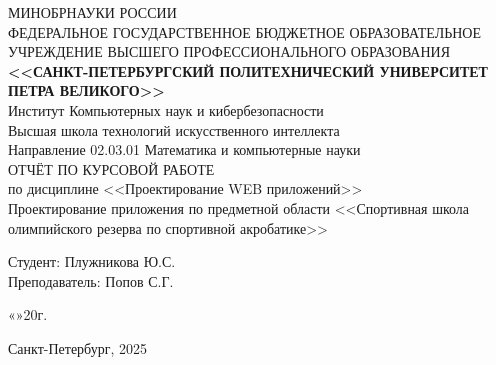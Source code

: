 \documentclass[12pt,a4paper,final]{article} %
\begin{document}
	\thispagestyle{empty}
	\begin{center}
		\vspace{36pt}
		{\Large МИНОБРНАУКИ РОССИИ }\\
		\vspace{24pt}
		{\large ФЕДЕРАЛЬНОЕ ГОСУДАРСТВЕННОЕ БЮДЖЕТНОЕ ОБРАЗОВАТЕЛЬНОЕ УЧРЕЖДЕНИЕ ВЫСШЕГО ПРОФЕССИОНАЛЬНОГО ОБРАЗОВАНИЯ}\\
		\vspace{24pt}
		{\Large \bf <<САНКТ-ПЕТЕРБУРГСКИЙ ПОЛИТЕХНИЧЕСКИЙ УНИВЕРСИТЕТ ПЕТРА ВЕЛИКОГО>>}\\
		\vspace{24pt}
		{\large Институт Компьютерных наук и кибербезопасности}\\
		{\large Высшая школа технологий искусственного интеллекта}\\
		{\large Направление 02.03.01 Математика и компьютерные науки}\\
		\vspace{36pt}
		{\Large ОТЧЁТ ПО КУРСОВОЙ РАБОТЕ}\\
		\vspace{12pt}
		{\large по дисциплине <<Проектирование WEB приложений>>}\\
		\vspace{24pt}
		{\large Проектирование приложения по предметной области <<Спортивная школа олимпийского резерва по спортивной акробатике>>}\\
	\end{center}
	\vspace{48pt}
	{\large Студент: \hspace{6.6cm} \underline{\hspace{3.5cm}} Плужникова Ю.С.}\\
	{\large Преподаватель: \hspace{5cm} \underline{\hspace{3.5cm}} Попов С.Г.}\\
	\vspace{24pt}
	\begin{flushright}
		«\underline{\hspace{1cm}}»\underline{\hspace{3cm}}20\underline{\hspace{0.7cm}}г.
	\end{flushright}
	\vspace{40pt}
	\begin{center}
		{\large Санкт-Петербург, 2025}
	\end{center}
	
\end{document}
